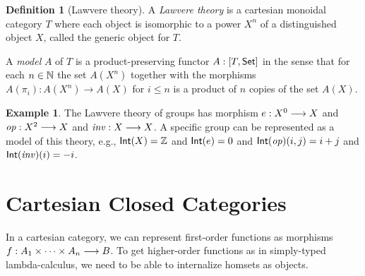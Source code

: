 \documentclass[a4paper,fleqn]{scrartcl}
\theoremstyle{definition}
\newtheorem{definition}{Definition}
\newtheorem{example}{Example}
\begin{document}
\begin{definition}[Lawvere theory]
  A \emph{Lawvere theory} is a cartesian monoidal category $T$ where
  each object is isomorphic to a power $X^n$ of a distinguished object
  $X$, called the generic object for $T$.

  A \emph{model} $A$ of $T$ is a product-preserving functor $A : [T,\mathsf{Set}]$
  in the sense that for each $n \in \mathbb{N}$ the set $A(X^{n})$ together
  with the morphisms $A(\pi_{i}) : A(X^{n}) \rightarrow A(X)$ for $i
  \leq n$ is a product of $n$ copies of the set $A(X)$.
\end{definition}
\begin{example}
  The Lawvere theory of groups has morphism $e : X^0 \longrightarrow X$ and
  $\mathit{op} : X^2 \longrightarrow X$ and $\mathit{inv} : X \longrightarrow X$.  A specific group can be
  represented as a model of this theory, e.g., $\mathsf{Int}(X) = \mathbb{Z}$ and
  $\mathsf{Int}(e) = 0$ and $\mathsf{Int}(\mathit{op})(i,j) = i + j$ and $\mathsf{Int}(\mathit{inv})(i) = -i$.
\end{example}

\section{Cartesian Closed Categories}

In a cartesian category, we can represent first-order functions as
morphisms $f : A_1 \times \dots \times A_n \longrightarrow B$.  To get
higher-order functions as in simply-typed lambda-calculus, we need to
be able to internalize homsets as objects.
\end{document}
